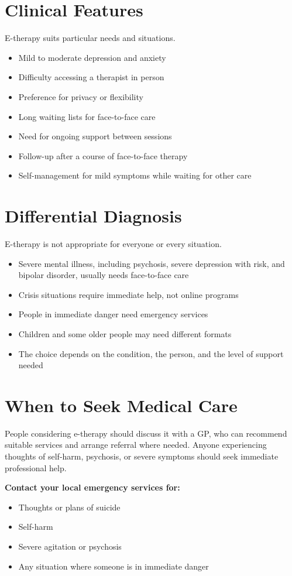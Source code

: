 \section*{Clinical Features}
E-therapy suits particular needs and situations.
\begin{itemize}
    \item Mild to moderate depression and anxiety
    \item Difficulty accessing a therapist in person
    \item Preference for privacy or flexibility
    \item Long waiting lists for face-to-face care
    \item Need for ongoing support between sessions
    \item Follow-up after a course of face-to-face therapy
    \item Self-management for mild symptoms while waiting for other care
\end{itemize}

\section*{Differential Diagnosis}
E-therapy is not appropriate for everyone or every situation.
\begin{itemize}
    \item Severe mental illness, including psychosis, severe depression with risk, and bipolar disorder, usually needs face-to-face care
    \item Crisis situations require immediate help, not online programs
    \item People in immediate danger need emergency services
    \item Children and some older people may need different formats
    \item The choice depends on the condition, the person, and the level of support needed
\end{itemize}

\section*{When to Seek Medical Care}
People considering e-therapy should discuss it with a GP, who can recommend suitable services and arrange referral where needed. Anyone experiencing thoughts of self-harm, psychosis, or severe symptoms should seek immediate professional help.

\textbf{Contact your local emergency services for:}
\begin{itemize}
    \item Thoughts or plans of suicide
    \item Self-harm
    \item Severe agitation or psychosis
    \item Any situation where someone is in immediate danger
\end{itemize}

